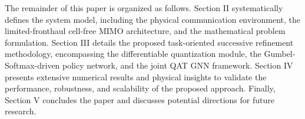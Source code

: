 The remainder of this paper is organized as follows. Section II systematically defines the system model, including the physical communication environment, the limited-fronthaul cell-free MIMO architecture, and the mathematical problem formulation. Section III details the proposed task-oriented successive refinement methodology, encompassing the differentiable quantization module, the Gumbel-Softmax-driven policy network, and the joint QAT GNN framework. Section IV presents extensive numerical results and physical insights to validate the performance, robustness, and scalability of the proposed approach. Finally, Section V concludes the paper and discusses potential directions for future research.